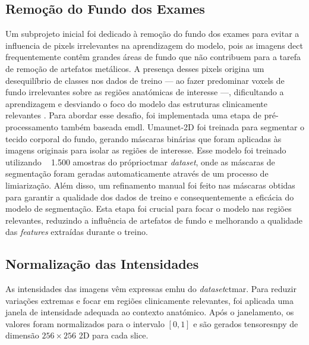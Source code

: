 \subsection{Remoção do Fundo dos Exames}
Um subprojeto inicial foi dedicado à remoção do fundo dos exames para evitar a influencia de pixels irrelevantes na aprendizagem do modelo, pois as imagens de\Acrshort{ct} frequentemente contêm grandes áreas de fundo que não contribuem para a tarefa de remoção de artefatos metálicos. A presença desses pixels origina um desequilíbrio de classes nos dados de treino — ao fazer predominar voxels de fundo irrelevantes sobre as regiões anatómicas de interesse —, dificultando a aprendizagem e desviando o foco do modelo das estruturas clinicamente relevantes \cite{taghanakiComboLossHandling2021, kesimalUseDeepLearning2026}. Para abordar esse desafio, foi implementada uma etapa de pré-processamento também baseada em\Acrfull{dl}. Uma\acrshort{unet}-2D foi treinada para segmentar o tecido corporal do fundo, gerando máscaras binárias que foram aplicadas às imagens originais para isolar as regiões de interesse. Esse modelo foi treinado utilizando ~ 1.500 amostras do próprio\acrshort{ctmar} \textit{dataset}, onde as máscaras de segmentação foram geradas automaticamente através de um processo de limiarização. Além disso, um refinamento manual foi feito nas máscaras obtidas para garantir a qualidade dos dados de treino e consequentemente a eficácia do modelo de segmentação.
Esta etapa foi crucial para focar o modelo nas regiões relevantes, reduzindo a influência de artefatos de fundo e melhorando a qualidade das \textit{features} extraídas durante o treino.
\subsection{Normalização das Intensidades}
As intensidades das imagens vêm expressas em\acrshort{hu} do \textit{dataset}\acrshort{ctmar}. Para reduzir variações extremas e focar em regiões clinicamente relevantes, foi aplicada uma janela de intensidade adequada ao contexto anatómico. Após o janelamento, os valores foram normalizados para o intervalo $[0,1]$ e são gerados tensores\acrshort{npy} de dimensão $256 \times 256$ 2D para cada slice.
